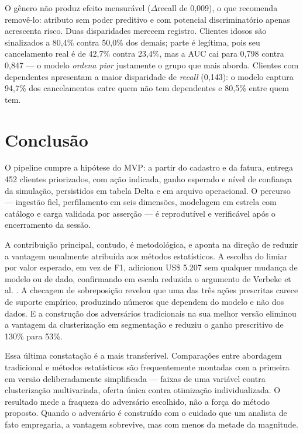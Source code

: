 \documentclass[10pt,a4paper]{article}
\begin{document}
O gênero não produz efeito mensurável (\(\Delta\)recall de 0,009), o que recomenda removê-lo:
atributo sem poder preditivo e com potencial discriminatório apenas acrescenta risco. Duas
disparidades merecem registro. Clientes idosos são sinalizados a 80,4\% contra 50,0\% dos
demais; parte é legítima, pois seu cancelamento real é de 42,7\% contra 23,4\%, mas a AUC cai
para 0,798 contra 0,847 --- o modelo \emph{ordena pior} justamente o grupo que mais aborda.
Clientes com dependentes apresentam a maior disparidade de \emph{recall} (0,143): o modelo
captura 94,7\% dos cancelamentos entre quem não tem dependentes e 80,5\% entre quem tem.

\section{Conclusão}

O pipeline cumpre a hipótese do MVP: a partir do cadastro e da fatura, entrega 452 clientes
priorizados, com ação indicada, ganho esperado e nível de confiança da simulação, persistidos em
tabela Delta e em arquivo operacional. O percurso --- ingestão fiel, perfilamento em seis
dimensões, modelagem em estrela com catálogo e carga validada por asserção --- é reprodutível e
verificável após o encerramento da sessão.

A contribuição principal, contudo, é metodológica, e aponta na direção de reduzir a vantagem
usualmente atribuída aos métodos estatísticos. A escolha do limiar por valor esperado, em vez
de F1, adicionou US\$ 5.207 sem qualquer mudança de modelo ou de dado, confirmando em escala
reduzida o argumento de Verbeke et al. \cite{verbeke}. A checagem de sobreposição revelou que
uma das três ações prescritas carece de suporte empírico, produzindo números que dependem do
modelo e não dos dados. E a construção dos adversários tradicionais na sua melhor versão
eliminou a vantagem da clusterização em segmentação e reduziu o ganho prescritivo de 130\%
para 53\%.

Essa última constatação é a mais transferível. Comparações entre abordagem tradicional e
métodos estatísticos são frequentemente montadas com a primeira em versão deliberadamente
simplificada --- faixas de uma variável contra clusterização multivariada, oferta única
contra otimização individualizada. O resultado mede a fraqueza do adversário escolhido,
não a força do método proposto. Quando o adversário é construído com o cuidado que um
analista de fato empregaria, a vantagem sobrevive, mas com menos da metade da magnitude.
\end{document}
